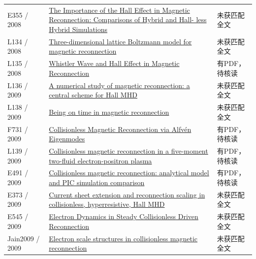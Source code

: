 \begin{longtable}{P{24mm}P{97mm}P{27mm}}
E355 / 2008 & \href{http://ui.adsabs.harvard.edu/abs/2008AGUSMSM24A..07M/abstract}{The Importance of the Hall Effect in Magnetic Reconnection: Comparisons of Hybrid and Hall- less Hybrid Simulations} & 未获匹配全文\\

L134 / 2008 & \href{https://doi.org/10.1103/physreve.77.026713}{Three-dimensional lattice Boltzmann model for magnetic reconnection} & 未获匹配全文\\

L135 / 2008 & \href{https://doi.org/10.11728/cjss2008.02.114}{Whistler Wave and Hall Effect in Magnetic Reconnection} & 有PDF，待核读\\

L136 / 2009 & \href{https://doi.org/10.1090/psapm/067.2/2605283}{A numerical study of magnetic reconnection: a central scheme for Hall MHD} & 未获匹配全文\\

L138 / 2009 & \href{https://doi.org/10.1088/1367-2630/11/6/063008}{Being on time in magnetic reconnection} & 未获匹配全文\\

F731 / 2009 & \href{https://doi.org/10.1103/physrevlett.102.245003}{Collisionless Magnetic Reconnection via Alfvén Eigenmodes} & 有PDF，待核读\\

L139 / 2009 & \href{https://doi.org/10.1090/psapm/067.2/2605264}{Collisionless magnetic reconnection in a five-moment two-fluid electron-positron plasma} & 有PDF，待核读\\

E491 / 2009 & \href{https://doi.org/10.5194/angeo-27-905-2009}{Collisionless magnetic reconnection: analytical model and PIC simulation comparison} & 有PDF，待核读\\

E373 / 2009 & \href{http://absimage.aps.org/image/DPP09/MWS_DPP09-2009-001646.pdf}{Current sheet extension and reconnection scaling in collisionless,  hyperresistive,  Hall MHD} & 未获匹配全文\\

E545 / 2009 & \href{http://id.nii.ac.jp/1013/00001414/}{Electron Dynamics in Steady Collisionless Driven Reconnection} & 未获匹配全文\\

Jain2009 / 2009 & \href{https://doi.org/10.1063/1.3134045}{Electron scale structures in collisionless magnetic reconnection} & 未获匹配全文\\


\end{longtable}
